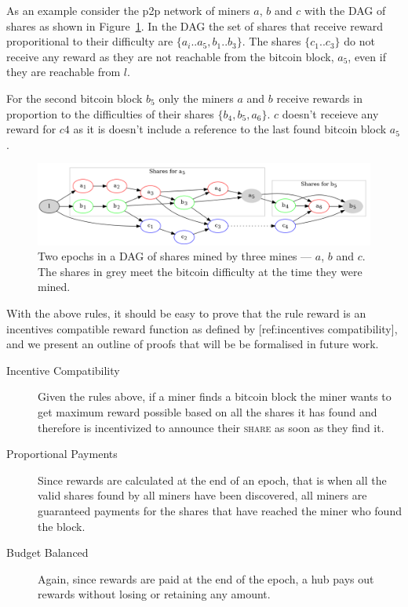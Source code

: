\documentclass{article}
\begin{document}
As an example consider the p2p network of miners $a$, $b$ and $c$ with
the DAG of shares as shown in Figure~\ref{fig:shares-dag}. In the DAG
the set of shares that receive reward proporitional to their
difficulty are $\{a_i..a_5, b_1..b_3\}$. The shares $\{c_1..c_3\}$ do
not receive any reward as they are not reachable from the bitcoin
block, $a_5$, even if they are reachable from $l$.

For the second bitcoin block $b_5$ only the miners $a$ and $b$ receive
rewards in proportion to the difficulties of their shares $\{b_4, b_5,
a_6\}$. $c$ doesn't receieve any reward for $c4$ as it is doesn't
include a reference to the last found bitcoin block $a_5$.

\begin{figure}[h]
  \begin{center}
    \includegraphics[width=1.0\textwidth]{shares-dag}
    \caption{Two epochs in a DAG of shares mined by three mines ---
      $a$, $b$ and $c$. The shares in grey meet the bitcoin difficulty
      at the time they were mined.}\label{fig:shares-dag}
  \end{center}
\end{figure}

With the above rules, it should be easy to prove that the rule reward
is an incentives compatible reward function as defined by
[ref:incentives compatibility], and we present an outline of proofs
that will be be formalised in future work.

\begin{description}
  \item [Incentive Compatibility] Given the rules above, if a miner
    finds a bitcoin block the miner wants to get maximum reward
    possible based on all the shares it has found and therefore is
    incentivized to announce their \textsc{share} as soon as they find
    it.
  \item [Proportional Payments] Since rewards are calculated at the
    end of an epoch, that is when all the valid shares found by all
    miners have been discovered, all miners are guaranteed payments
    for the shares that have reached the miner who found the block.
  \item [Budget Balanced] Again, since rewards are paid at the end of
    the epoch, a hub pays out rewards without losing or retaining any
    amount.
\end{description}
\end{document}

